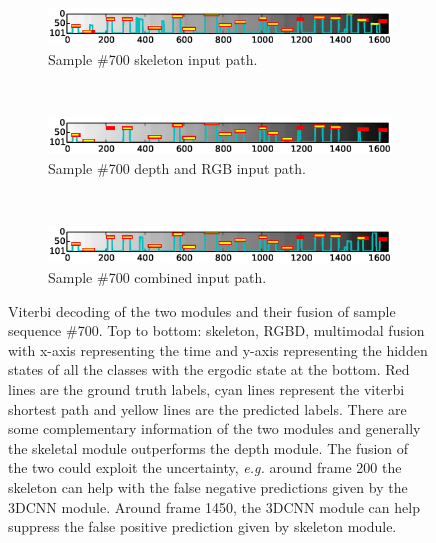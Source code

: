 \begin{figure}[t]
        \centering
        \begin{subfigure}[c]{.8\textwidth}
                \includegraphics[width=\textwidth]{images/path/Sample0700_sk}
\vspace*{-3mm}
                \caption{Sample \#700 skeleton input path.}
                \label{Sample0700_sk}
        \end{subfigure}%
        ~ %

        \begin{subfigure}[c]{0.8\textwidth}
                \includegraphics[width=\textwidth]{images/path/Sample0700_cnn}
\vspace*{-3mm}
                \caption{Sample \#700 depth and RGB input path.}
                \label{Sample0700_cnn}
        \end{subfigure}

        ~ %
        \begin{subfigure}[c]{0.8\textwidth}
                \includegraphics[width=\textwidth]{images/path/Sample0700_combined}
\vspace*{-3mm}
                \caption{Sample \#700 combined input path.}
                \label{Sample0700_combined}
        \end{subfigure}

  \caption{Viterbi decoding of the two modules and their fusion of sample sequence \#700. Top to bottom: skeleton, RGBD, multimodal fusion with x-axis representing the time and y-axis representing the hidden states of all the classes with the ergodic state at the bottom. Red lines are the ground truth labels, cyan lines represent the viterbi shortest path and yellow lines are the predicted labels. There are some complementary information of the two modules and generally the skeletal module outperforms the depth module. The fusion of the two could exploit the uncertainty, \emph{e.g.} around frame 200 the skeleton can help with the false negative predictions given by the 3DCNN module. Around frame 1450, the 3DCNN module can help suppress the false positive prediction given by skeleton module.
  }\label{Sample0700_comparison}
\end{figure}

